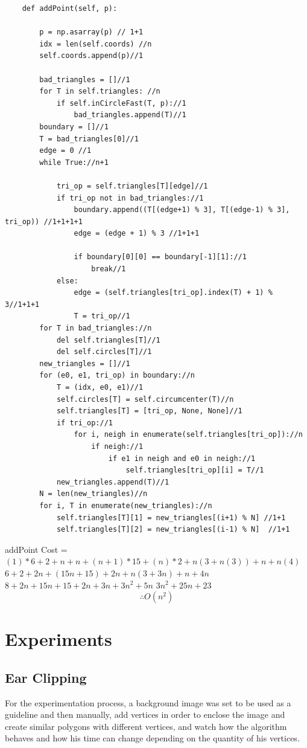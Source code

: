 \documentclass[conference]{IEEEtran}
\begin{document}
\begin{lstlisting}
    def addPoint(self, p):
    
        p = np.asarray(p) // 1+1
        idx = len(self.coords) //n
        self.coords.append(p)//1

        bad_triangles = []//1
        for T in self.triangles: //n
            if self.inCircleFast(T, p)://1
                bad_triangles.append(T)//1
        boundary = []//1
        T = bad_triangles[0]//1
        edge = 0 //1
        while True://n+1
           
            tri_op = self.triangles[T][edge]//1
            if tri_op not in bad_triangles://1
                boundary.append((T[(edge+1) % 3], T[(edge-1) % 3], tri_op)) //1+1+1+1
                edge = (edge + 1) % 3 //1+1+1

                if boundary[0][0] == boundary[-1][1]://1
                    break//1
            else:
                edge = (self.triangles[tri_op].index(T) + 1) % 3//1+1+1
                T = tri_op//1
        for T in bad_triangles://n
            del self.triangles[T]//1
            del self.circles[T]//1
        new_triangles = []//1
        for (e0, e1, tri_op) in boundary://n
            T = (idx, e0, e1)//1
            self.circles[T] = self.circumcenter(T)//n
            self.triangles[T] = [tri_op, None, None]//1
            if tri_op://1
                for i, neigh in enumerate(self.triangles[tri_op])://n
                    if neigh://1
                        if e1 in neigh and e0 in neigh://1
                            self.triangles[tri_op][i] = T//1
            new_triangles.append(T)//1
        N = len(new_triangles)//n
        for i, T in enumerate(new_triangles)://n
            self.triangles[T][1] = new_triangles[(i+1) % N] //1+1  
            self.triangles[T][2] = new_triangles[(i-1) % N]  //1+1
\end{lstlisting}
addPoint Cost = 
\newline
$(1)*6+2+n+n+(n+1)*15+(n)*2+n(3+n(3))+n+n(4)$
\newline
$6+2+2n+(15n+15)+2n+n(3+3n)+n+4n$
\newline
$8+2n+15n+15+2n+3n+3n^2+5n$
\newline
$3n^2+25n+23$
$$\therefore O(n^2)$$
\section{Experiments}
\subsection{Ear Clipping}
For the experimentation process, a background image was set to be used as a guideline and then manually, add vertices in order to enclose the image and create similar polygons with different vertices, and watch how the algorithm behaves and how his time can change depending on the quantity of his vertices.
\end{document}

